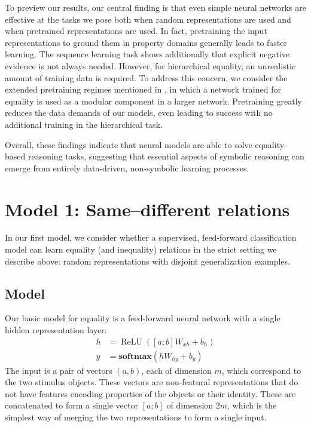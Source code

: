 \documentclass[9pt,twocolumn,twoside,lineno]{pnas-new}
\newcommand{\update}[1]{{\color{darkblue}#1}}
\newcommand{\softmax}{\mathbf{softmax}}
\DeclareMathOperator{\ReLU}{ReLU}
\begin{document}
To preview our results, our central finding is that even simple neural networks are effective at the tasks we pose both when random representations are used and when pretrained representations are used. In fact, \update{ pretraining the input representations to ground them in property domains generally leads to faster learning}.  The sequence learning task shows additionally that explicit negative evidence is not always needed. However, for hierarchical equality, an unrealistic amount of training data is required. To address this concern, we consider the \update{extended pretraining regimes mentioned in \secref{sec:representations}, in which a network trained for equality is used as a modular component in a larger network.} Pretraining greatly reduces the data demands of our models, even leading to success with no additional training in the hierarchical task.

Overall, these findings indicate that neural models are able to solve equality-based reasoning tasks, suggesting that essential aspects of symbolic reasoning can emerge from entirely data-driven, non-symbolic learning processes.


\section*{Model 1: Same--different relations}\label{sec:equality}

In our first model, we consider whether a supervised, feed-forward classification model can learn equality (and inequality) relations in the strict setting we describe above: random representations with disjoint generalization examples.


\subsection*{Model}

Our basic model for equality is a feed-forward neural network with a single hidden representation layer:
%
\begin{align}
  h &= \ReLU([a;b]W_{xh} + b_{h}) \label{eq:x2h}\\
  y &= \softmax(hW_{hy} + b_{y}) \label{eq:h2y}
\end{align}
%
The input is a pair of vectors $(a, b)$, each of dimension $m$, which correspond to the two stimulus objects. These vectors are non-featural representations that do not have features encoding properties of the objects or their identity. These are concatenated to form a single vector $[a;b]$ of dimension $2m$, which is the simplest way of merging the two representations to form a single input.
\end{document}

